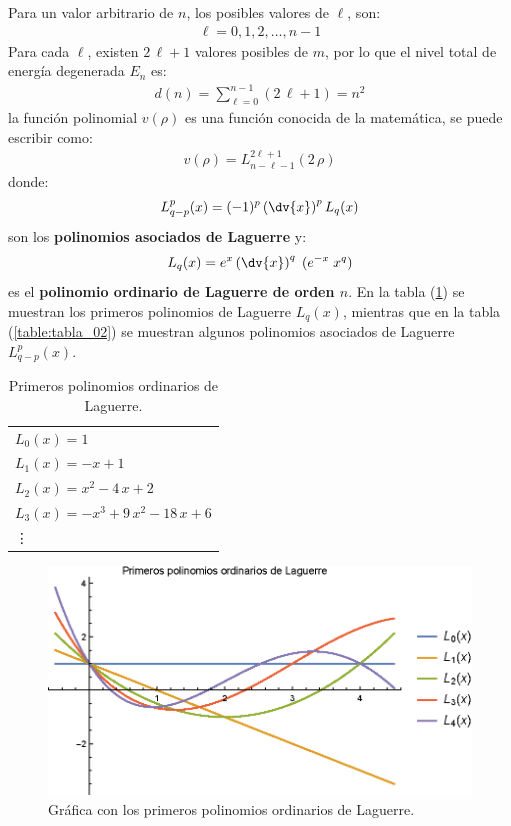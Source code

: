 Para un valor arbitrario de $n$, los posibles valores de $\ell$, son:
\begin{align}
\ell = 0, 1, 2, \ldots, n - 1
\label{eq:ecuacion_04_84}
\end{align}
Para cada $\ell$, existen $2 \, \ell + 1$ valores posibles de $m$, por lo que el nivel total de energía degenerada $E_{n}$ es:
\begin{align}
d(n) = \sum_{\ell = 0}^{n - 1} (2 \, \ell + 1) = n^{2}
\label{eq:ecuacion_04_85}
\end{align}
la función polinomial $v(\rho)$ es una función conocida de la matemática, se puede escribir como:
\begin{align}
v(\rho) = L_{n-\ell-1}^{2\ell+1}(2 \, \rho)
\label{eq:ecuacion_04_86}
\end{align}
donde:
\begin{align}
L_{q-p}^{p} (x) = (-1)^{p} \left( \dv{x} \right)^{p} L_{q}(x)
\label{eq:ecuacion_04_87}
\end{align}
son los \textbf{polinomios asociados de Laguerre} y:
\begin{align}
L_{q}(x) = e^{x} \left( \dv{x} \right)^{q} \; (e^{-x} \; x^{q})
\label{eq:ecuacion_04_88}
\end{align}
es el \textbf{polinomio ordinario de Laguerre de orden $n$}.
En la tabla (\ref{table:tabla_01}) se muestran los primeros polinomios de Laguerre $L_{q}(x)$, mientras que en la tabla (\ref{table:tabla_02}) se muestran algunos polinomios asociados de Laguerre $L_{q-p}^{p}(x)$.
\begin{table}[H]
\centering
\begin{tabular}{l}
$L_{0} (x) = 1$ \\
$L_{1} (x) = - x + 1$ \\
$L_{2} (x) = x^{2} - 4 \, x + 2$ \\
$L_{3} (x) = - x^{3} + 9 \, x^{2} - 18 \, x + 6$ \\
\vdots 
\end{tabular}
\caption{Primeros polinomios ordinarios de Laguerre.}
\label{table:tabla_01}
\end{table}
\begin{figure}[H]
    \centering
    \includegraphics[scale=1.2]{Imagenes/Polinomios_Laguerre_01.eps}
    \caption{Gráfica con los primeros polinomios ordinarios de Laguerre.}
    \label{fig:grafica_Laguerre_01}
\end{figure}
